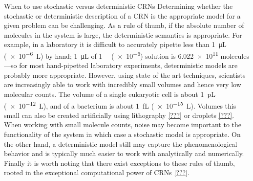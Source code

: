 \begin{breakout}{When to use stochastic versus deterministic CRNs}
  Determining whether the stochastic or deterministic description of a CRN is the appropriate model for a given problem can be challenging. As a rule of thumb, if the absolute number of molecules in the system is large, the deterministic semantics is appropriate. For example, in a laboratory it is difficult to accurately pipette less than \SI{1}{\micro\liter} (\SI{e-6}{\liter}) by hand; \SI{1}{\micro\liter} of \SI{1}{\micro\Molar} (\SI{e-6}{\Molar}) solution is \num{6.022e11} molecules---so for most hand-pipetted laboratory experiments, deterministic models are probably more appropriate. However, using state of the art techniques, scientists are increasingly able to work with incredibly small volumes and hence very low molecular counts. The volume of a single eukaryotic cell is about \SI{1}{\pico\liter} (\SI{e-12}{\liter}), and of a bacterium is about \SI{1}{\femto\liter} (\SI{e-15}{\liter}). Volumes this small can also be created artificially using lithography \ref{???} or droplets \ref{???}. When working with small molecule counts, noise may become important to the functionality of the system in which case a stochastic model is appropriate. On the other hand, a deterministic model still may capture the phenomenological behavior and is typically much easier to work with analytically and numerically. Finally it is worth noting that there exist exceptions to these rules of thumb, rooted in the exceptional computational power of CRNs \ref{???}.
\end{breakout}


